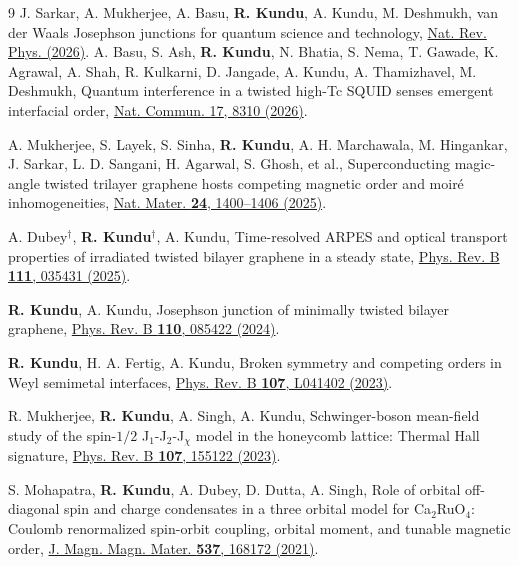 \documentclass[a4paper,11pt]{article}
\begin{document}
\begin{thebibliography}{9}
J. Sarkar, A. Mukherjee, A. Basu, \textbf{R. Kundu}, A. Kundu, M. Deshmukh,
van der Waals Josephson junctions for quantum science and technology,
\href{https://doi.org/10.1038/s42254-026-00970-5}{Nat. Rev. Phys. (2026)}.
    A. Basu, S. Ash, \textbf{R. Kundu}, N. Bhatia, S. Nema, T. Gawade, K. Agrawal, A. Shah, R. Kulkarni, D. Jangade, A. Kundu, A. Thamizhavel, M. Deshmukh,
    Quantum interference in a twisted high-Tc SQUID senses emergent interfacial order, \href{https://doi.org/10.1038/s41467-026-75124-3}{Nat. Commun. 17, 8310 (2026)}.


    A. Mukherjee, S. Layek, S. Sinha, \textbf{R. Kundu}, A. H. Marchawala, M. Hingankar, J. Sarkar, L. D. Sangani, H. Agarwal, S. Ghosh, et al., 
    Superconducting magic-angle twisted trilayer graphene hosts competing magnetic order and moir\'{e} inhomogeneities, 
    \href{https://doi.org/10.1038/s41563-025-02252-4}{Nat. Mater. \textbf{24}, 1400--1406 (2025)}.

    A. Dubey$^\dagger$, \textbf{R. Kundu}$^\dagger$, A. Kundu, 
    Time-resolved ARPES and optical transport properties of irradiated twisted bilayer graphene in a steady state, 
    \href{https://doi.org/10.1103/PhysRevB.111.035431}{Phys. Rev. B \textbf{111}, 035431 (2025)}.

    \textbf{R. Kundu}, A. Kundu, 
    Josephson junction of minimally twisted bilayer graphene, 
    \href{https://link.aps.org/doi/10.1103/PhysRevB.110.085422}{Phys. Rev. B \textbf{110}, 085422 (2024)}.

    \textbf{R. Kundu}, H. A. Fertig, A. Kundu, 
    Broken symmetry and competing orders in Weyl semimetal interfaces, 
    \href{https://doi.org/10.1103/physrevb.107.l041402}{Phys. Rev. B \textbf{107}, L041402 (2023)}.

    R. Mukherjee, \textbf{R. Kundu}, A. Singh, A. Kundu, 
    Schwinger-boson mean-field study of the spin-$1/2$ J$_1$-J$_2$-J$_{\chi}$ model in the honeycomb lattice: Thermal Hall signature, 
    \href{https://doi.org/10.1103/physrevb.107.155122}{Phys. Rev. B \textbf{107}, 155122 (2023)}.

    S. Mohapatra, \textbf{R. Kundu}, A. Dubey, D. Dutta, A. Singh, 
    Role of orbital off-diagonal spin and charge condensates in a three orbital model for Ca$_2$RuO$_4$: Coulomb renormalized spin-orbit coupling, orbital moment, and tunable magnetic order, 
    \href{https://doi.org/10.1016/j.jmmm.2021.168172}{J. Magn. Magn. Mater. \textbf{537}, 168172 (2021)}.

\end{thebibliography}
\end{document}
